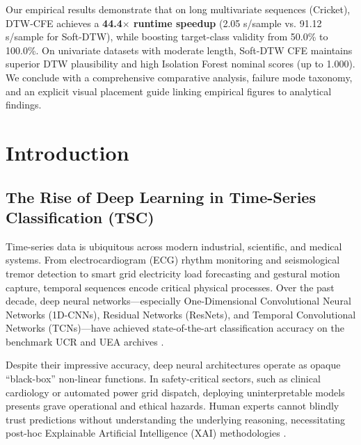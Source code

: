 \documentclass[11pt,a4paper]{report}
\begin{document}
Our empirical results demonstrate that on long multivariate sequences (Cricket), DTW-CFE achieves a \textbf{44.4$\times$ runtime speedup} (2.05 s/sample vs. 91.12 s/sample for Soft-DTW), while boosting target-class validity from 50.0\% to 100.0\%. On univariate datasets with moderate length, Soft-DTW CFE maintains superior DTW plausibility and high Isolation Forest nominal scores (up to 1.000). We conclude with a comprehensive comparative analysis, failure mode taxonomy, and an explicit visual placement guide linking empirical figures to analytical findings.

\chapter{Introduction}

\section{The Rise of Deep Learning in Time-Series Classification (TSC)}
Time-series data is ubiquitous across modern industrial, scientific, and medical systems. From electrocardiogram (ECG) rhythm monitoring and seismological tremor detection to smart grid electricity load forecasting and gestural motion capture, temporal sequences encode critical physical processes. Over the past decade, deep neural networks—especially One-Dimensional Convolutional Neural Networks (1D-CNNs), Residual Networks (ResNets), and Temporal Convolutional Networks (TCNs)—have achieved state-of-the-art classification accuracy on the benchmark UCR and UEA archives \cite{ismail2019deep, dau2019ucr, bagnall2017uea}. 

Despite their impressive accuracy, deep neural architectures operate as opaque ``black-box'' non-linear functions. In safety-critical sectors, such as clinical cardiology or automated power grid dispatch, deploying uninterpretable models presents grave operational and ethical hazards. Human experts cannot blindly trust predictions without understanding the underlying reasoning, necessitating post-hoc Explainable Artificial Intelligence (XAI) methodologies \cite{guidotti2018survey}.
\end{document}
